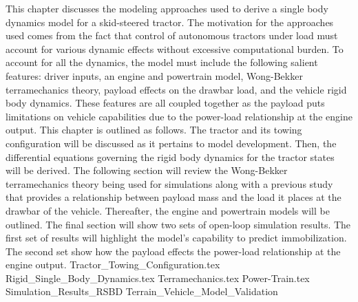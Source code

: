 This chapter discusses the modeling approaches used to derive a single body dynamics model for a skid-steered tractor. The motivation for the approaches used comes from the fact that control of autonomous tractors under load must account for various dynamic effects without excessive computational burden. To account for all the dynamics, the model must include the following salient features: driver inputs, an engine and powertrain model, Wong-Bekker terramechanics theory, payload effects on the drawbar load, and the vehicle rigid body dynamics. These features are all coupled together as the payload puts limitations on vehicle capabilities due to the power-load relationship at the engine output. This chapter is outlined as follows. The tractor and its towing configuration will be discussed as it pertains to model development. Then, the differential equations governing the rigid body dynamics for the tractor states will be derived. The following section will review the Wong-Bekker terramechanics theory being used for simulations along with a previous study that provides a relationship between payload mass and the load it places at the drawbar of the vehicle. Thereafter, the engine and powertrain models will be outlined. The final section will show two sets of open-loop simulation results. The first set of results will highlight the model's capability to predict immobilization. The second set show how the payload effects the power-load relationship at the engine output.
{Tractor_Towing_Configuration.tex}
{Rigid_Single_Body_Dynamics.tex}
{Terramechanics.tex}
{Power-Train.tex}
{Simulation_Results_RSBD}
{Terrain_Vehicle_Model_Validation}